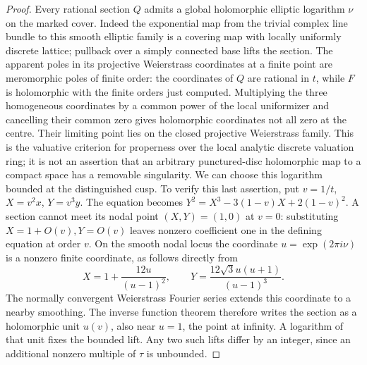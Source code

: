 \begin{proof}
Every rational section $Q$ admits a global holomorphic elliptic
logarithm $\nu$ on the marked cover.  Indeed the exponential map
from the trivial complex line bundle to this smooth elliptic family
is a covering map with locally uniformly discrete lattice; pullback
over a simply connected base lifts the section.  The apparent poles
in its projective Weierstrass coordinates at a finite point are
meromorphic poles of finite order: the coordinates of $Q$ are
rational in $t$, while $F$ is holomorphic with the finite orders
just computed.  Multiplying the three homogeneous coordinates by
a common power of the local uniformizer and cancelling their
common zero gives holomorphic coordinates not all zero at the
centre.  Their limiting point lies on the closed projective
Weierstrass family.  This is the valuative criterion for properness
over the local analytic discrete valuation ring; it is not an
assertion that an arbitrary punctured-disc holomorphic map to a
compact space has a removable singularity.
We can choose this logarithm bounded at the distinguished cusp.
To verify this last assertion, put $v=1/t$, $X=v^2x$, $Y=v^3y$.
The equation becomes
$Y^2=X^3-3(1-v)X+2(1-v)^2$.  A section cannot meet its nodal point
$(X,Y)=(1,0)$ at $v=0$: substituting $X=1+O(v),Y=O(v)$ leaves
nonzero coefficient one in the defining equation at order $v$.
On the smooth nodal locus the coordinate
$u=\exp(2\pi i\nu)$ is a nonzero finite coordinate, as follows
directly from
\[
X=1+\frac{12u}{(u-1)^2},\qquad
Y=\frac{12\sqrt3u(u+1)}{(u-1)^3}.
\]
The normally convergent Weierstrass Fourier series extends this
coordinate to a nearby smoothing.  The inverse function theorem
therefore writes the section as a holomorphic unit $u(v)$, also
near $u=1$, the point at infinity.  A logarithm of that unit fixes
the bounded lift.  Any two such lifts differ by an integer, since
an additional nonzero multiple of $\tau$ is unbounded.


\end{proof}
